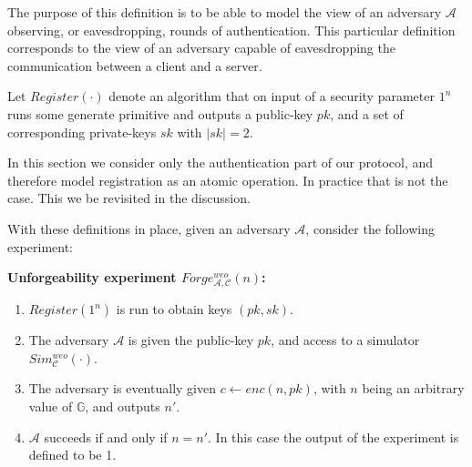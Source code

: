 The purpose of this definition is to be able to model the view of an adversary $\mathcal{A}$ observing, or eavesdropping, rounds of authentication. This particular definition corresponds to the view of an adversary capable of eavesdropping the communication between a \gls{client} and a \gls{server}. 

\begin{definition}[Registration]
Let $Register(\cdot)$ denote an algorithm that on input of a security parameter $1^n$ runs some generate primitive and outputs a public-key $pk$, and a set of corresponding private-keys $sk$ with $\lvert sk \rvert = 2$.
\end{definition}

In this section we consider only the authentication part of our protocol, and therefore model registration as an atomic operation. In practice that is not the case. This we be revisited in the discussion.

With these definitions in place, given an adversary $\mathcal{A}$, consider the following experiment:

\vspace{1em}
\noindent\textbf{Unforgeability experiment $Forge^{weo}_{\mathcal{A}, \mathcal{C}}(n)$:}
\begin{enumerate}

    
    
    
    \item $Register(1^n)$ is run to obtain keys $(pk, sk)$.
    
    \item The adversary $\mathcal{A}$ is given the public-key $pk$, and access to a simulator $Sim^{weo}_\mathcal{C}(\cdot)$. %
    
    \item The adversary is eventually given $c \leftarrow enc(n,pk)$, with $n$ being an arbitrary value of $\mathbb{G}$, and outputs $n'$.
    
    \item $\mathcal{A}$ succeeds if and only if $n = n'$.
    In this case the output of the experiment is defined to be 1.
\end{enumerate}


